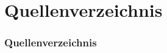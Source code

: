 \documentclass[11pt]{beamer}
\begin{document}
	\begin{frame}
		\maketitle
	\end{frame}
	
	
	
	
	

	\section{Quellenverzeichnis}
	\begin{frame}[allowframebreaks]
		\frametitle{Quellenverzeichnis}
		
		
	\end{frame}
	
\end{document}
